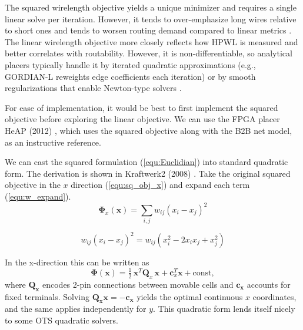 The squared wirelength objective yields a unique minimizer and requires a single linear solve per iteration. 
However, it tends to over-emphasize long wires relative to short ones and tends to worsen routing demand compared to linear metrics \cite{AP_2000}. 
The linear wirelength objective more closely reflects how HPWL is measured and better correlates with routability. 
However, it is non-differentiable, so analytical placers typically handle it by iterated quadratic approximations (e.g., GORDIAN-L reweights edge coefficients each iteration) or by smooth regularizations that enable Newton-type solvers \cite{AP_2000}. 



For ease of implementation, it would be best to first implement the squared objective before exploring the linear objective.
We can use the FPGA placer HeAP (2012) \cite{AP_2012}, which uses the squared objective along with the B2B net model, as an instructive reference.

We can cast the squared formulation (\ref{equ:Euclidian}) into standard quadratic form. 
The derivation is shown in Kraftwerk2 (2008) \cite{kraftwerk2}.
Take the original squared objective in the $x$ direction (\ref{equ:sq_obj_x}) and expand each term (\ref{equ:w_expand}).
\begin{equation}
    {\boldsymbol{\Phi}}_x (\boldsymbol{x}) = \sum_{i, j} w_{ij} \left( x_i - x_j \right)^2
    \label{equ:sq_obj_x}
\end{equation}



\begin{equation}
    w_{ij}(x_i - x_j)^2 = w_{ij} \left(x_i^2 - 2 x_i x_j + x_j^2 \right)
    \label{equ:w_expand}
\end{equation}






In the x-direction this can be written as
\begin{equation}
    \boldsymbol{\Phi} (\boldsymbol{x}) 
    = \tfrac{1}{2}\,\boldsymbol{x}^T \boldsymbol{Q}_x\,\boldsymbol{x} + \boldsymbol{c}_x^T \boldsymbol{x} + \text{const},
    \label{equ:quadratic}
\end{equation}
where $\boldsymbol{Q_x}$ encodes 2-pin connections between movable cells and $\boldsymbol{c_x}$ accounts for fixed terminals.  
Solving $\boldsymbol{Q_x}\boldsymbol{x} = -\boldsymbol{c_x}$ yields the optimal continuous $x$ coordinates, and the same applies independently for $y$.
This quadratic form lends itself nicely to some OTS quadratic solvers.



